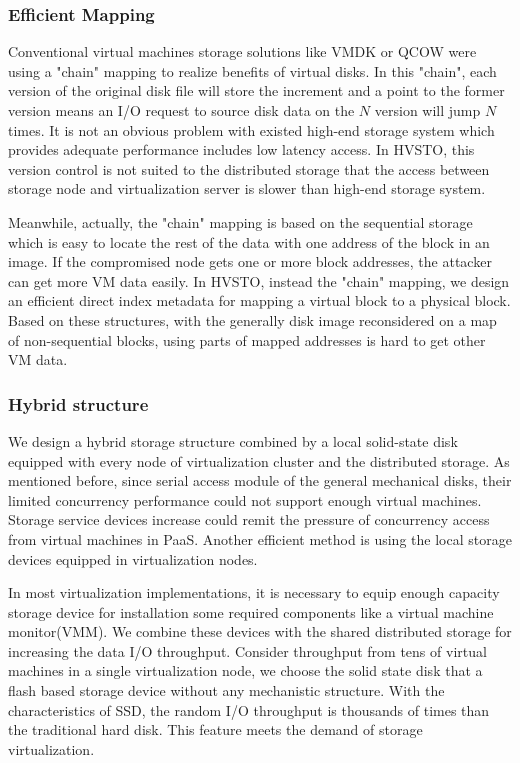 \documentclass[conference]{IEEEtran}
\begin{document}
\subsubsection{Efficient Mapping}
Conventional virtual machines storage solutions like VMDK\cite{VMDK2007} or QCOW\cite{QCOW2007} were using a "chain" mapping to realize benefits of virtual disks. In this "chain", each version of the original disk file will store the increment and a point to the former version means an I/O request to source disk data on the $N$ version will jump $N$ times. It is not an obvious problem with existed high-end storage system which provides adequate performance includes low latency access. In HVSTO, this version control is not suited to the distributed storage that the access between storage node and virtualization server is slower than high-end storage system.

Meanwhile, actually, the "chain" mapping is based on the sequential storage which is easy to locate the rest of the data with one address of the block in an image. If the compromised node gets one or more block addresses, the attacker can get more VM data easily. In HVSTO, instead the "chain" mapping, we design an efficient direct index metadata for mapping a virtual block to a physical block. Based on these structures, with the generally disk image reconsidered on a map of non-sequential blocks, using parts of mapped addresses is hard to get other VM data.


\subsubsection{Hybrid structure}
We design a hybrid storage structure combined by a local solid-state disk equipped with every node of virtualization cluster and the distributed storage. As mentioned before, since serial access module of the general mechanical disks, their limited concurrency performance could not support enough virtual machines. Storage service devices increase could remit the pressure of concurrency access from virtual machines in PaaS. Another efficient method is using the local storage devices equipped in virtualization nodes.

In most virtualization implementations, it is necessary to equip enough capacity storage device for installation some required components like a virtual machine monitor(VMM)\cite{Barham2003}. We combine these devices with the shared distributed storage for increasing the data I/O throughput. Consider throughput from tens of virtual machines in a single virtualization node, we choose the solid state disk that a flash based storage device without any mechanistic structure. With the characteristics of SSD, the random I/O throughput is thousands of times than the traditional hard disk. This feature meets the demand of storage virtualization\cite{Agrawal2008}.
\end{document}
